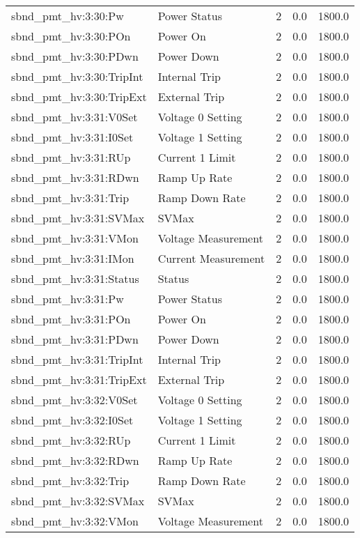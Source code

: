 \begin{center}
\begin{longtable}{l | l l l l }
sbnd\_pmt\_hv:3:30:Pw & Power Status & 2 & 0.0 & 1800.0\\ 
sbnd\_pmt\_hv:3:30:POn & Power On & 2 & 0.0 & 1800.0\\ 
sbnd\_pmt\_hv:3:30:PDwn & Power Down & 2 & 0.0 & 1800.0\\ 
sbnd\_pmt\_hv:3:30:TripInt & Internal Trip & 2 & 0.0 & 1800.0\\ 
sbnd\_pmt\_hv:3:30:TripExt & External Trip & 2 & 0.0 & 1800.0\\ 
sbnd\_pmt\_hv:3:31:V0Set & Voltage 0 Setting & 2 & 0.0 & 1800.0\\ 
sbnd\_pmt\_hv:3:31:I0Set & Voltage 1 Setting & 2 & 0.0 & 1800.0\\ 
sbnd\_pmt\_hv:3:31:RUp & Current 1 Limit & 2 & 0.0 & 1800.0\\ 
sbnd\_pmt\_hv:3:31:RDwn & Ramp Up Rate & 2 & 0.0 & 1800.0\\ 
sbnd\_pmt\_hv:3:31:Trip & Ramp Down Rate & 2 & 0.0 & 1800.0\\ 
sbnd\_pmt\_hv:3:31:SVMax & SVMax & 2 & 0.0 & 1800.0\\ 
sbnd\_pmt\_hv:3:31:VMon & Voltage Measurement & 2 & 0.0 & 1800.0\\ 
sbnd\_pmt\_hv:3:31:IMon & Current Measurement & 2 & 0.0 & 1800.0\\ 
sbnd\_pmt\_hv:3:31:Status & Status & 2 & 0.0 & 1800.0\\ 
sbnd\_pmt\_hv:3:31:Pw & Power Status & 2 & 0.0 & 1800.0\\ 
sbnd\_pmt\_hv:3:31:POn & Power On & 2 & 0.0 & 1800.0\\ 
sbnd\_pmt\_hv:3:31:PDwn & Power Down & 2 & 0.0 & 1800.0\\ 
sbnd\_pmt\_hv:3:31:TripInt & Internal Trip & 2 & 0.0 & 1800.0\\ 
sbnd\_pmt\_hv:3:31:TripExt & External Trip & 2 & 0.0 & 1800.0\\ 
sbnd\_pmt\_hv:3:32:V0Set & Voltage 0 Setting & 2 & 0.0 & 1800.0\\ 
sbnd\_pmt\_hv:3:32:I0Set & Voltage 1 Setting & 2 & 0.0 & 1800.0\\ 
sbnd\_pmt\_hv:3:32:RUp & Current 1 Limit & 2 & 0.0 & 1800.0\\ 
sbnd\_pmt\_hv:3:32:RDwn & Ramp Up Rate & 2 & 0.0 & 1800.0\\ 
sbnd\_pmt\_hv:3:32:Trip & Ramp Down Rate & 2 & 0.0 & 1800.0\\ 
sbnd\_pmt\_hv:3:32:SVMax & SVMax & 2 & 0.0 & 1800.0\\ 
sbnd\_pmt\_hv:3:32:VMon & Voltage Measurement & 2 & 0.0 & 1800.0\\ 

\end{longtable}
\end{center}
